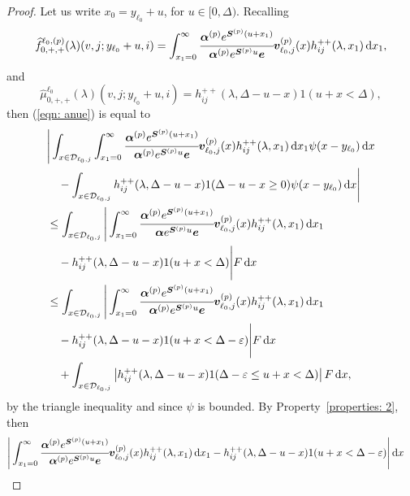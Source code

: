 \begin{proof} 
				Let us write \(x_0=y_{\ell_0}+u\), for \(u\in[0,\Delta)\). Recalling
                \[\widehat f^{\ell_0,(p)}_{0,+,+}(\lambda)(v,j; y_{\ell_0}+u,i) = \int_{x_1=0}^\infty \cfrac{\boldsymbol \alpha^{(p)} e^{\boldsymbol{S}^{(p)}(u+x_1)} }{\boldsymbol \alpha^{(p)} e^{\boldsymbol{S}^{(p)}u} \boldsymbol e} {\boldsymbol v}_{\ell_0,j}^{(p)}(x)h_{ij}^{++}(\lambda,x_1)\, \mathrm{d} x_1,\]
				and 
				\[\widehat \mu^{\ell_0}_{0,+,+}(\lambda)(v,j; y_{\ell_0}+u,i) = h_{ij}^{++}(\lambda,\Delta-u-x)1(u+x<\Delta),\]
				then (\ref{eqn: anue}) is equal to 
                \begin{align}
                	&\Bigg|\int_{x\in\mathcal{D}_{\ell_0,j}} \int_{x_1=0}^\infty \cfrac{\boldsymbol \alpha^{(p)} e^{\boldsymbol{S}^{(p)}(u+x_1)} }{\boldsymbol \alpha^{(p)} e^{\boldsymbol{S}^{(p)}u} \boldsymbol e} {\boldsymbol v}^{(p)}_{\ell_0,j}(x)h_{ij}^{++} (\lambda,x_1)\, \mathrm{d} x_1 \psi(x-y_{\ell_0})\, \mathrm{d} x  \nonumber 
		\\&\quad{}- \int_{x\in\mathcal{D}_{\ell_0,j}} h_{ij}^{++}(\lambda,\Delta-u-x) 1(\Delta-u-x\geq 0) \psi(x-y_{\ell_0})\, \mathrm{d} x\Bigg| \nonumber 
                	\\&\leq \int_{x\in\mathcal{D}_{\ell_0,j}} \Bigg|  \int_{x_1=0}^\infty \cfrac{\boldsymbol \alpha^{(p)} e^{\boldsymbol{S}^{(p)}(u+x_1)} }{\boldsymbol \alpha e^{\boldsymbol{S}^{(p)}u} \boldsymbol e} {\boldsymbol v}_{\ell_0,j}^{(p)}(x)h_{ij}^{++} (\lambda,x_1)\, \mathrm{d} x_1  \nonumber 
					\\&\quad{}- h_{ij}^{++}(\lambda,\Delta-u-x) 1(u+x<\Delta) \Bigg| F \, \mathrm{d} x\nonumber 
                	\\&\leq \int_{x\in\mathcal{D}_{\ell_0,j}} \Bigg|  \int_{x_1=0}^\infty \cfrac{\boldsymbol \alpha^{(p)} e^{\boldsymbol{S}^{(p)}(u+x_1)} }{\boldsymbol \alpha^{(p)} e^{\boldsymbol{S}^{(p)}u} \boldsymbol e} {\boldsymbol v}^{(p)}_{\ell_0,j}(x)h_{ij}^{++} (\lambda,x_1)\, \mathrm{d} x_1 \nonumber
					\\&\quad{} - h_{ij}^{++}(\lambda,\Delta-u-x) 1(u+x< \Delta - \varepsilon) \Bigg| F \, \mathrm{d} x\nonumber 
                	\\&\quad {}+ \int_{x\in\mathcal{D}_{\ell_0,j}} \left| h_{ij}^{++}(\lambda,\Delta-u-x) 1(\Delta - \varepsilon \leq u+x<\Delta) \right| F \, \mathrm{d} x, \label{eqn: ALllllLsdnn}
                \end{align}
				by the triangle inequality and since \(\psi\) is bounded. 
                By Property~\ref{properties: 2}, then 
				\begin{align}
					& \Bigg|  \int_{x_1=0}^\infty \cfrac{\bs \alpha^{(p)} e^{\bs{S}^{(p)}(u+x_1)} }{\bs \alpha^{(p)} e^{\bs{S}^{(p)}u} \bs e} {\bs v}^{(p)}_{\ell_0,j}(x)h_{ij}^{++} (\lambda,x_1)\wrt x_1 
					- h_{ij}^{++}(\lambda,\Delta-u-x) 1(u+x< \Delta - \varepsilon) \Bigg| \wrt x\nonumber 

\end{align}
\end{proof}
